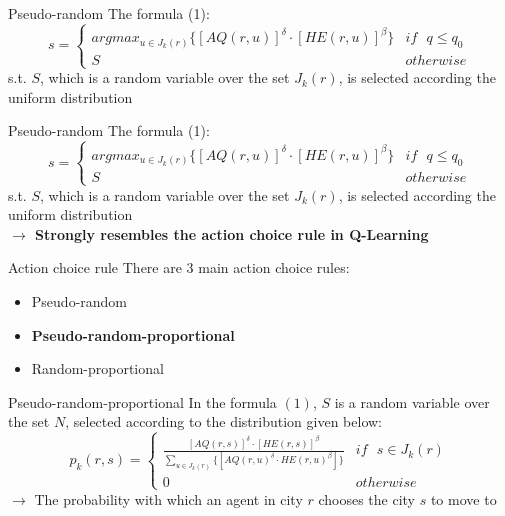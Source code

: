 \documentclass[aspectratio=169,xcolor=dvipsnames]{beamer}
\begin{document}
\begin{frame}{Pseudo-random}
    The formula (1):
    \begin{equation*}
        s = \begin{cases}argmax_{u\in J_{k}(r)}\{\left[ AQ(r, u)\right]^\delta \cdot\left[HE(r, u)\right]^\beta\}&if\text{ } q\leq q_0\\S&otherwise\end{cases}
    \end{equation*}
    s.t. $S$, which is a random variable over the set $J_k(r)$, is selected according the uniform distribution
\end{frame}

\begin{frame}{Pseudo-random}
    The formula (1):
    \begin{equation*}
        s = \begin{cases}argmax_{u\in J_{k}(r)}\{\left[ AQ(r, u)\right]^\delta \cdot\left[HE(r, u)\right]^\beta\}&if\text{ } q\leq q_0\\S&otherwise\end{cases}
    \end{equation*}
    s.t.
    \textbf{$S$}, which is a random variable over the set $J_k(r)$, is selected according the uniform distribution\\
    \textbf{$\rightarrow$ Strongly resembles the action choice rule in Q-Learning}
\end{frame}

\begin{frame}{Action choice rule}
    There are 3 main action choice rules:
    \begin{itemize}
        \item Pseudo-random
        \item \textbf{Pseudo-random-proportional}
        \item Random-proportional
    \end{itemize}
\end{frame}

\begin{frame}{Pseudo-random-proportional}
    In the formula $(1)$, $S$ is a random variable over the set $N$, selected according to the distribution given below:
    \begin{equation*}
        p_k(r, s) = \begin{cases}\frac{\left[AQ\left(r, s\right)\right]^\delta \cdot\left[HE(r, s)\right]^\beta}{\sum_{u \in J_k(r)}\{\left[AQ\left(r, u\right)^\delta\cdot HE\left(r, u\right)^\beta\right]\}} &if \text{ }s\in J_k(r)\\0 &otherwise\end{cases}
    \end{equation*}
    $\rightarrow$ The probability with which an agent in city $r$ chooses the city $s$ to move to
\end{frame}
\end{document}
